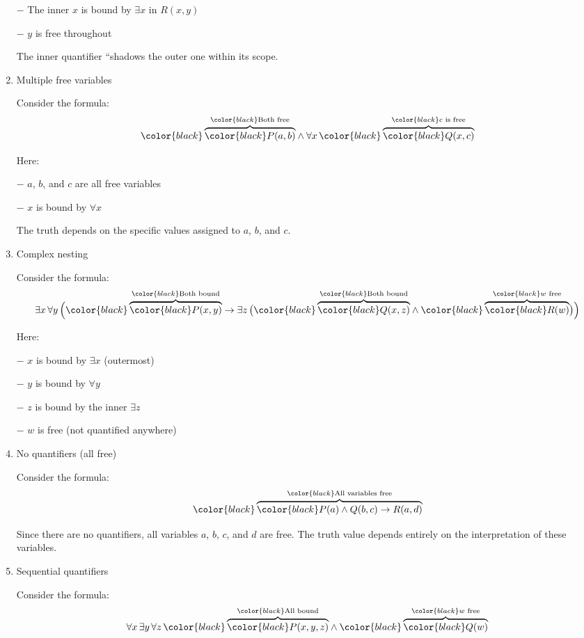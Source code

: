 \begin{enumerate}
  − The inner \(x\) is bound by \(\exists x\) in \(R(x,y)\)

  − \(y\) is free throughout

  The inner quantifier ``shadows the outer one within its scope.
\item
  Multiple free variables

  Consider the formula: \[
   {\color{black}\overbrace{\color{black}P(a, b)}^{\color{black}\text{Both free}}} \wedge 
   \forall x \,
   {\color{black}\overbrace{\color{black}Q(x, c)}^{\color{black}c \text{ is free}}}
   \]

  Here:

  − \(a\), \(b\), and \(c\) are all free variables

  − \(x\) is bound by \(\forall x\)

  The truth depends on the specific values assigned to \(a\), \(b\), and
  \(c\).
\item
  Complex nesting

  Consider the formula: \[
   \exists x \, \forall y \, \Big(
   {\color{black}\overbrace{\color{black}P(x, y)}^{\color{black}\text{Both bound}}} \rightarrow
   \exists z \,
   \big(
   {\color{black}\overbrace{\color{black}Q(x, z)}^{\color{black}\text{Both bound}}} \wedge
   {\color{black}\overbrace{\color{black}R(w)}^{\color{black}w \text{ free}}}
   \big)
   \Big)
   \]

  Here:

  − \(x\) is bound by \(\exists x\) (outermost)

  − \(y\) is bound by \(\forall y\)

  − \(z\) is bound by the inner \(\exists z\)

  − \(w\) is free (not quantified anywhere)
\item
  No quantifiers (all free)

  Consider the formula: \[
   {\color{black}\overbrace{\color{black}P(a) \wedge Q(b, c) \rightarrow R(a, d)}^{\color{black}\text{All variables free}}}
   \]

  Since there are no quantifiers, all variables \(a\), \(b\), \(c\), and
  \(d\) are free. The truth value depends entirely on the interpretation
  of these variables.
\item
  Sequential quantifiers

  Consider the formula: \[
   \forall x \, \exists y \, \forall z \, 
   {\color{black}\overbrace{\color{black}P(x, y, z)}^{\color{black}\text{All bound}}} \wedge 
   {\color{black}\overbrace{\color{black}Q(w)}^{\color{black}w \text{ free}}}
   \]


\end{enumerate}
